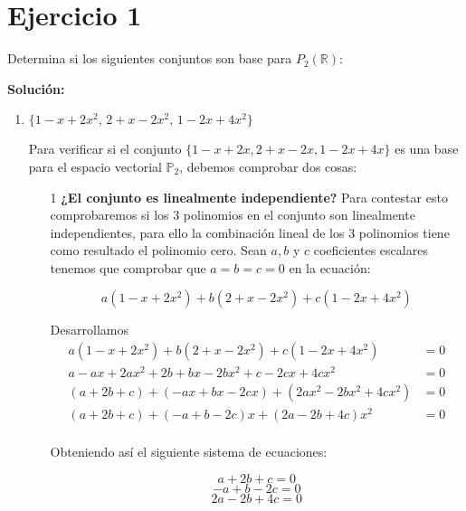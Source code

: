 \section*{Ejercicio 1}

Determina si los siguientes conjuntos son base para $P_2(\mathbb{R})$:


\noindent \textbf{Solución:}

\begin{enumerate}
    \item $\{ 1 - x + 2x^{2},\, 2 + x - 2x^{2},\, 1 - 2x + 4x^{2} \}$
    
    Para verificar si el conjunto $\{1 - x + 2x, 2 + x - 2x, 1 - 2x + 4x\}$ es una base para el espacio vectorial $\mathbb{P}_2$, debemos comprobar dos cosas:
    \begin{enumerate}
        \item[1] \textbf{¿El conjunto es linealmente independiente?} Para contestar esto comprobaremos
        si los 3 polinomios en el conjunto son linealmente independientes, para ello la combinación
        lineal de los 3 polinomios tiene como resultado el polinomio cero. Sean $a, b$ y $c$
        coeficientes escalares tenemos que comprobar que $a = b = c = 0$ en la ecuación:

        $$a(1 - x + 2x^2) + b(2 + x - 2x^2) + c(1 - 2x + 4x^2)$$

        Desarrollamos
        \begin{align*}
            a(1 - x + 2x^2) + b(2 + x - 2x^2) + c(1 - 2x + 4x^2) &= 0 \\
            a - ax + 2ax^2 + 2b + bx - 2bx^2 + c - 2cx + 4cx^2 &= 0 \\
            (a + 2b + c) + (-ax + bx - 2cx) + (2ax^2 - 2bx^2 + 4cx^2) &= 0 \\
            (a + 2b + c) + (-a + b - 2c)x + (2a - 2b + 4c)x^2 &= 0 \\
        \end{align*}
            
        Obteniendo así el siguiente sistema de ecuaciones:

        \begin{equation}
            a + 2b + c = 0                
        \end{equation}
        \begin{equation}
            -a + b -2c = 0
        \end{equation}
        \begin{equation}
            2a - 2b + 4c = 0
        \end{equation}


\end{enumerate}
\end{enumerate}
